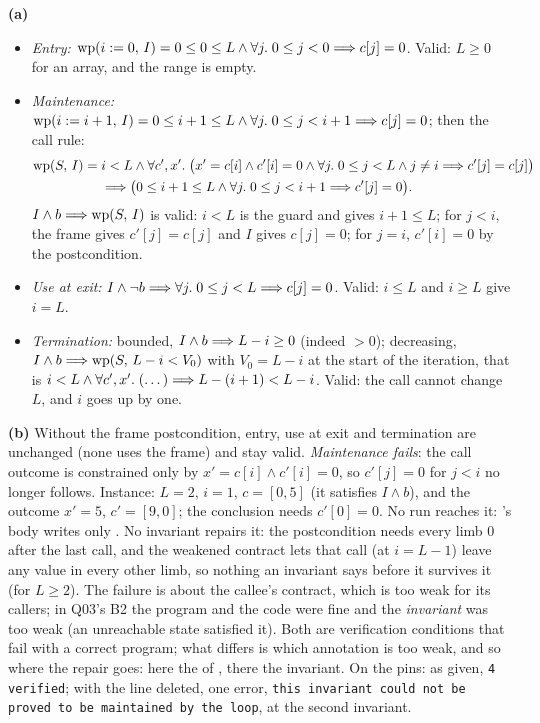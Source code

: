 \documentclass[11pt]{article}
\begin{document}
\textbf{(a)}
\begin{itemize}
\item \emph{Entry:} $\mathrm{wp}(i \mathrel{:=} 0,\,I) = 0 \leq 0 \leq L \wedge \forall j .\;
  0 \leq j < 0 \Longrightarrow c[j] = 0$. Valid: $L \geq 0$ for an array, and the range
  is empty.
\item \emph{Maintenance:} $\mathrm{wp}(i \mathrel{:=} i + 1,\,I) = 0 \leq i + 1 \leq L \wedge
  \forall j .\; 0 \leq j < i + 1 \Longrightarrow c[j] = 0$; then the call rule:
  \[ \begin{aligned} \mathrm{wp}(S,\,I) = {} & i < L \wedge \forall c', x' .\; \bigl(x' = c[i] \wedge c'[i] = 0
     \wedge \forall j .\; 0 \leq j < L \wedge j \neq i \Longrightarrow c'[j] = c[j]\bigr) \\
     & \Longrightarrow \bigl(0 \leq i + 1 \leq L \wedge \forall j .\; 0 \leq j < i + 1 \Longrightarrow
     c'[j] = 0\bigr). \end{aligned} \]
  $I \wedge b \Longrightarrow \mathrm{wp}(S,\,I)$ is valid: $i < L$ is the guard and gives
  $i + 1 \leq L$; for $j < i$, the frame gives $c'[j] = c[j]$ and $I$ gives
  $c[j] = 0$; for $j = i$, $c'[i] = 0$ by the postcondition.
\item \emph{Use at exit:} $I \wedge \neg b \Longrightarrow \forall j .\; 0 \leq j < L
  \Longrightarrow c[j] = 0$. Valid: $i \leq L$ and $i \geq L$ give $i = L$.
\item \emph{Termination:} bounded, $I \wedge b \Longrightarrow L - i \geq 0$ (indeed
  $> 0$); decreasing, $I \wedge b \Longrightarrow \mathrm{wp}(S,\,L - i < V_0)$ with $V_0 = L - i$
  at the start of the iteration, that is $i < L \wedge \forall c', x' .\;
  (\dots) \Longrightarrow L - (i + 1) < L - i$. Valid: the call cannot change $L$, and
  $i$ goes up by one.
\end{itemize}

\textbf{(b)} Without the frame postcondition, entry, use at exit and
termination are unchanged (none uses the frame) and stay valid.
\emph{Maintenance fails}: the call outcome is constrained only by
$x' = c[i] \wedge c'[i] = 0$, so $c'[j] = 0$ for $j < i$ no longer follows.
Instance: $L = 2$, $i = 1$, $c = [0, 5]$ (it satisfies $I \wedge b$), and the
outcome $x' = 5$, $c' = [9, 0]$; the conclusion needs $c'[0] = 0$. No run
reaches it: 's body writes only . No invariant repairs
it: the postcondition needs every limb $0$ after the last call, and the
weakened contract lets that call (at $i = L - 1$) leave any value in every
other limb, so nothing an invariant says before it survives it (for
$L \geq 2$). The failure is about the callee's contract, which is too weak for
its callers; in Q03's B2 the program and the code were fine and the
\emph{invariant} was too weak (an unreachable state satisfied it). Both are
verification conditions that fail with a correct program; what differs is
which annotation is too weak, and so where the repair goes: here the
 of , there the invariant. On the pins: as given,
\texttt{4 verified}; with the line deleted, one error, \texttt{this invariant
could not be proved to be maintained by the loop}, at the second invariant.
\end{document}
